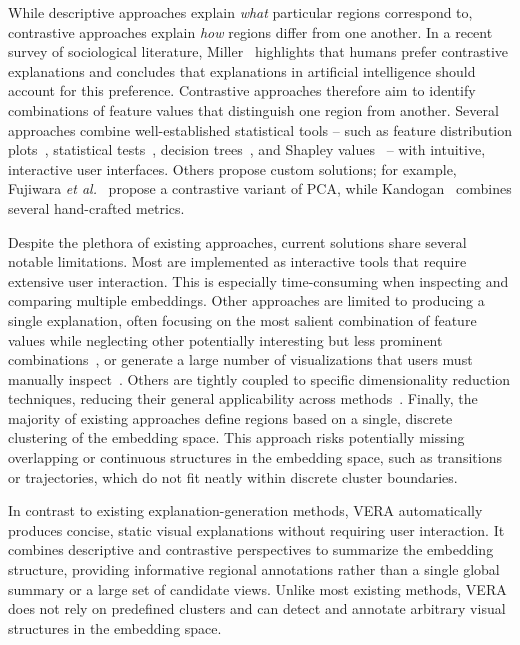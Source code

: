 \documentclass[lettersize,journal]{IEEEtran}
\newcommand{\etal}{\textit{et al.\xspace}}
\begin{document}
While descriptive approaches explain \textit{what} particular regions correspond to, contrastive approaches explain \textit{how} regions differ from one another. In a recent survey of sociological literature, Miller~\cite{Miller2019} highlights that humans prefer contrastive explanations and concludes that explanations in artificial intelligence should account for this preference.
Contrastive approaches therefore aim to identify combinations of feature values that distinguish one region from another.
Several approaches combine well-established statistical tools -- such as feature distribution plots~\cite{Stahnke2016,Eckelt2022}, statistical tests~\cite{Marcilio2021}, decision trees~\cite{Bibal2021}, and Shapley values~\cite{MarcilioEler2021} -- with intuitive, interactive user interfaces.
Others propose custom solutions; for example, Fujiwara \etal~\cite{Fujiwara2020} propose a contrastive variant of PCA, while Kandogan~\cite{Kandogan2012} combines several hand-crafted metrics.

Despite the plethora of existing approaches, current solutions share several notable limitations. Most are implemented as interactive tools that require extensive user interaction. This is especially time-consuming when inspecting and comparing multiple embeddings.
Other approaches are limited to producing a single explanation, often focusing on the most salient combination of feature values while neglecting other potentially interesting but less prominent combinations~\cite{DaSilva2015,VanDriel2020,Tian2021}, or generate a large number of visualizations that users must manually inspect~\cite{Faust2019,Plumb2020}.
Others are tightly coupled to specific dimensionality reduction techniques, reducing their general applicability across methods~\cite{Chatzimparmpas2020,Broeksema2013,ChengMueller2016}. Finally, the majority of existing approaches define regions based on a single, discrete clustering of the embedding space. This approach risks potentially missing overlapping or continuous structures in the embedding space, such as transitions or trajectories, which do not fit neatly within discrete cluster boundaries.

In contrast to existing explanation-generation methods, VERA automatically produces concise, static visual explanations without requiring user interaction. It combines descriptive and contrastive perspectives to summarize the embedding structure, providing informative regional annotations rather than a single global summary or a large set of candidate views. Unlike most existing methods, VERA does not rely on predefined clusters and can detect and annotate arbitrary visual structures in the embedding space.
\end{document}
